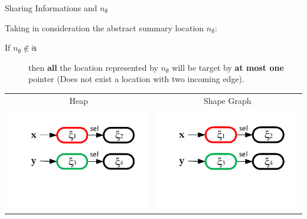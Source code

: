 \documentclass[xcolor=svgnames,11pt]{beamer}
\begin{document}
\begin{frame}{Sharing Informations and $n_\emptyset$}

Taking in consideration the abstract summary location $n_\emptyset$:

\medskip

\begin{description}
\item[If $n_\emptyset \not\in \mathsf{is}$] then \textbf{all} the location represented by $n_\emptyset$ will be target by \textbf{at most one} pointer (Does not exist a location with two incoming edge).
\end{description}

\medskip

\begin{tabular}{cc}
\textcolor{bl}{Heap} & \textcolor{bl}{Shape Graph} \\
\includegraphics[page=1,scale=0.65]{../figures/fig12.pdf} & \includegraphics[page=2,scale=0.65]{../figures/fig12.pdf}\\
\end{tabular}


\end{frame}
\end{document}
